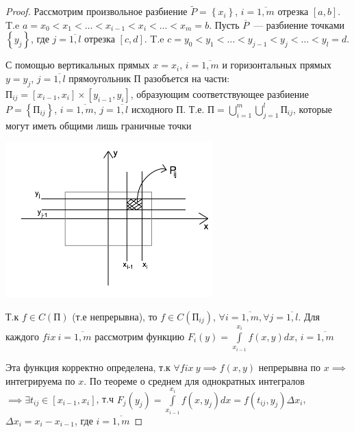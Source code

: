 \documentclass[../../main.tex]{subfiles}
\begin{document}
\begin{proof}
	Рассмотрим произвольное разбиение $ \widetilde{P} = 
	\left\lbrace x_i \right\rbrace  $, $i = \overline{1,m} $ 
	отрезка $ \left[ a, b\right]  $. T.e $a = x_0 < x_1 < \dots 
	< x_{i-1} < x_i < \dots < x_m = b $. Пусть $ \overline{P} $~--- 
	разбиение точками $ \left\lbrace y_j \right\rbrace  $, 
	 где $j = \overline{1, l} $ отрезка $ \left[ c, d\right]  $. 
	 T.e $c = y_0 < y_1 < \dots < y_{j-1} < y_j < \dots < y_l = d $.
	 
	 С помощью вертикальных прямых $ x = x_i $, $ i = \overline{1, m} $
	 и горизонтальных прямых $ y = y_j $, $ j = \overline{1, l} $
	 прямоугольник $ \text{П} $ разобъется на части: $ \text{П}_{ij} = 
	 \left[ x_{i - 1}, x_i \right] \times \left[ y_{i - 1}, y_i \right] $, 
	 образующим соответствующее разбиение 
	 $ P = \left\lbrace \text{П}_{ij} \right\rbrace $,
	 $ i = \overline{1, m} $, $ j = \overline{1, l} $ 
	 исходного $ \text{П} $. Т.е. $ \text{П} = 
	 \bigcup\limits_{i = 1}^m \bigcup\limits_{j = 1}^l \text{П}_{ij}$, 
	 которые могут иметь общими лишь граничные точки
	 
	 \begin{center}
	 	\includegraphics[width=0.6\textwidth]{lec13_rectangle.png}
	 \end{center}
 
 	Т.к $ f \in C( \text{П} )$ (т.е непрерывна), то $ f \in C( \text{П}_{ij} )$,
 	$ \forall i = \overline{1, m} , \forall j = \overline{1, l}$. Для каждого 
 	$ fix\ i = \overline{1, m} $ рассмотрим функцию $ F_i \left( y \right) = 
 	\int\limits_{ x_{i - 1} } ^ {x_i} f \left( x, y \right) dx $, 
 	$ i = \overline{1, m} $
 	
 	Эта функция корректно определена, 
 	т.к $ \forall fix\ y \implies f \left( x, y\right) $
 	непрерывна по $ x \implies $ интегрируема по $ x $. По теореме о среднем
 	для однократных интегралов $ \implies \exists t_{ij} \in 
 	\left[ x_{i - 1}, x_i \right] $, т.ч $ F_j \left( y_j \right) = 
 	\int\limits_{x_{i - 1} } ^ {x_i} f \left( x, y_j \right) dx = 
 	f \left(  t_{ij}, y_j \right) \Delta x_i$, 
 	$ \Delta x_i = x_i - x_{i - 1}$, где 
 	$ i = \overline{1, m} $
 	

\end{proof}
\end{document}
